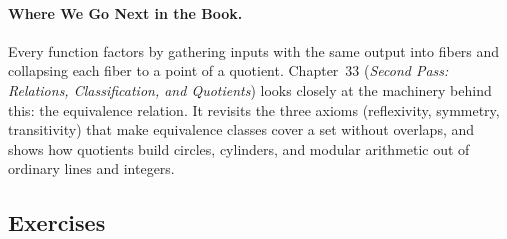 \paragraph{Where We Go Next in the Book.}
Every function factors by gathering inputs with the same output into fibers and collapsing each fiber to a point of a quotient. Chapter~33 (\emph{Second Pass: Relations, Classification, and Quotients}) looks closely at the machinery behind this: the equivalence relation. It revisits the three axioms (reflexivity, symmetry, transitivity) that make equivalence classes cover a set without overlaps, and shows how quotients build circles, cylinders, and modular arithmetic out of ordinary lines and integers.

\subsection{Exercises}

